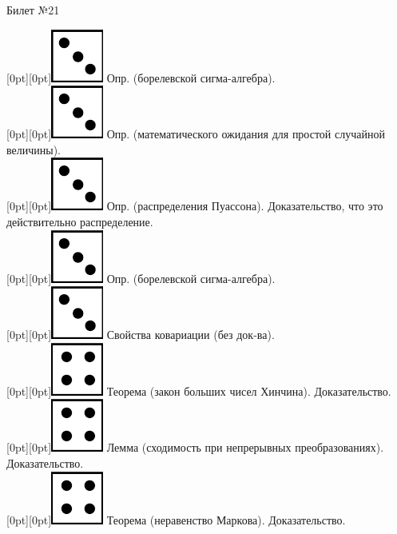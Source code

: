 \documentclass[10pt]{article}
\begin{document}
\begin{center} {\Large Билет №21} \end{center} 

\raisebox{-1pt}[0pt][0pt]{\includegraphics[width=0.02\linewidth]{3.png}} Опр. (борелевской сигма-алгебра). \\

\raisebox{-1pt}[0pt][0pt]{\includegraphics[width=0.02\linewidth]{3.png}} Опр. (математического ожидания для простой случайной величины). \\

\raisebox{-1pt}[0pt][0pt]{\includegraphics[width=0.02\linewidth]{3.png}}  Опр. (распределения Пуассона). Доказательство, что это действительно распределение. \\

\raisebox{-1pt}[0pt][0pt]{\includegraphics[width=0.02\linewidth]{3.png}} Опр. (борелевской сигма-алгебра). \\

\raisebox{-1pt}[0pt][0pt]{\includegraphics[width=0.02\linewidth]{3.png}} Свойства ковариации (без док-ва). \\

\raisebox{-1pt}[0pt][0pt]{\includegraphics[width=0.02\linewidth]{4.png}}  Теорема (закон больших чисел Хинчина).  Доказательство. \\

\raisebox{-1pt}[0pt][0pt]{\includegraphics[width=0.02\linewidth]{4.png}} Лемма  (сходимость при непрерывных преобразованиях). Доказательство. \\

\raisebox{-1pt}[0pt][0pt]{\includegraphics[width=0.02\linewidth]{4.png}} Теорема (неравенство Маркова). Доказательство. \\
\end{document}
